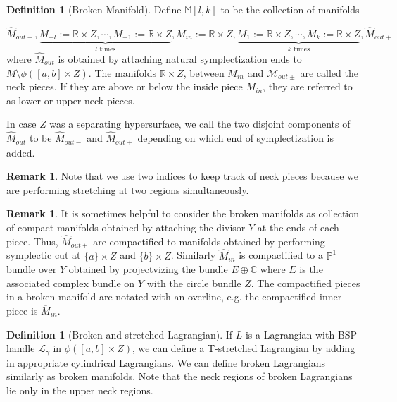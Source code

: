 \documentclass[11pt, oneside,dvipsnames]{amsart}
\newcommand{\<}{\langle}
\renewcommand{\>}{\rangle}
\newcommand{\inn}{{in}}
\newcommand{\out}{{out}}
\newcommand{\outp}{{out+}}
\newcommand{\outm}{{out-}}
\newcommand{\M}{\mathcal{M}}
\newcommand{\bC}{\mathbb{C}}
\newcommand{\bM}{\mathbb{M}}
\newcommand{\bP}{\mathbb{P}}
\newcommand{\bR}{\mathbb{R}}
\newcommand{\cL}{\mathcal{L}}
\newcommand{\sm}{\ensuremath{\setminus}}
\theoremstyle{definition}
\theoremstyle{definition}
\newtheorem{remark}[Theorem]{Remark}
\newtheorem{defn}[Theorem]{Definition}
\numberwithin{equation}{subsection}
\begin{document}
\begin{defn}[Broken Manifold]
Define $\bM [l,k]$ to be the  collection of manifolds 

$$\widehat{M}_\outm, \underbrace{M_{-l}:=\bR \times Z ,\cdots, M_{-1}:=\bR \times Z}_{l \text{ times}} , {M}_\inn := \bR \times Z , \underbrace{M_1 := \bR \times Z ,\cdots,M_k := \bR \times Z}_{k \text{ times}}, \widehat{M}_\outp  $$
where $\widehat{M}_\out$ is obtained by attaching natural symplectization ends to $M \sm \phi([a,b] \times Z).$ The manifolds $\bR \times Z$, between $M_\inn$ and $\M_{out\pm}$  are called the neck pieces. If they are above or below the inside piece $M_\inn$, they are referred to as lower or upper neck pieces.


In case $Z$ was a separating hypersurface, we call the two disjoint components of $\widehat{M}_\out$ to be $\widehat{M}_\outm$ and $\widehat{M}_\outp$ depending on which end of symplectization is added.
\end{defn}

\begin{remark}
    Note that we use two indices to keep track of neck pieces because we are performing stretching at two regions simultaneously.

\end{remark}
\begin{remark}
    
It is sometimes helpful to consider the broken manifolds as collection of compact manifolds obtained by attaching the divisor $Y$ at the ends of each piece. Thus, $\widehat{M}_{out \pm}$ are compactified to manifolds obtained by performing symplectic cut at $\{a\} \times Z$ and $\{b\} \times Z$. Similarly $\widehat{M}_\inn$ is compactified to a $\bP^1$ bundle over $Y$ obtained by projectvizing the bundle $E\oplus \bC$ where $E$ is the associated complex bundle on $Y$ with the circle bundle $Z$. The compactified pieces in a broken manifold are notated with an overline, e.g. the compactified inner piece is $\overline{M}_\inn$.
\end{remark}

\begin{defn}[Broken and stretched Lagrangian]
    If $L$ is a Lagrangian with BSP handle $\cL_\gamma$ in $\phi([a,b] \times Z)$, we can define a T-stretched Lagrangian by adding in appropriate cylindrical Lagrangians. We can define broken Lagrangians similarly as broken manifolds. Note that the neck regions of broken Lagrangians lie only in the upper neck regions.
\end{defn}
\end{document}
